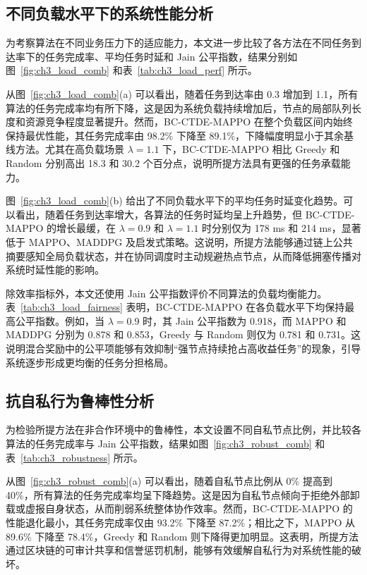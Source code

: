 \subsection{不同负载水平下的系统性能分析}
为考察算法在不同业务压力下的适应能力，本文进一步比较了各方法在不同任务到达率下的任务完成率、平均任务时延和 Jain 公平指数，结果分别如图~\ref{fig:ch3_load_comb} 和表~\ref{tab:ch3_load_perf} 所示。

从图~\ref{fig:ch3_load_comb}(a) 可以看出，随着任务到达率由 0.3 增加到 1.1，所有算法的任务完成率均有所下降，这是因为系统负载持续增加后，节点的局部队列长度和资源竞争程度显著提升。然而，BC-CTDE-MAPPO 在整个负载区间内始终保持最优性能，其任务完成率由 98.2\% 下降至 89.1\%，下降幅度明显小于其余基线方法。尤其在高负载场景 $\lambda=1.1$ 下，BC-CTDE-MAPPO 相比 Greedy 和 Random 分别高出 18.3 和 30.2 个百分点，说明所提方法具有更强的任务承载能力。

图~\ref{fig:ch3_load_comb}(b) 给出了不同负载水平下的平均任务时延变化趋势。可以看出，随着任务到达率增大，各算法的任务时延均呈上升趋势，但 BC-CTDE-MAPPO 的增长最缓，在 $\lambda=0.9$ 和 $\lambda=1.1$ 时分别仅为 178 ms 和 214 ms，显著低于 MAPPO、MADDPG 及启发式策略。这说明，所提方法能够通过链上公共摘要感知全局负载状态，并在协同调度时主动规避热点节点，从而降低拥塞传播对系统时延性能的影响。

除效率指标外，本文还使用 Jain 公平指数评价不同算法的负载均衡能力。表~\ref{tab:ch3_load_fairness} 表明，BC-CTDE-MAPPO 在各负载水平下均保持最高公平指数。例如，当 $\lambda=0.9$ 时，其 Jain 公平指数为 0.918，而 MAPPO 和 MADDPG 分别为 0.878 和 0.853，Greedy 与 Random 则仅为 0.781 和 0.731。这说明混合奖励中的公平项能够有效抑制“强节点持续抢占高收益任务”的现象，引导系统逐步形成更均衡的任务分担格局。

\subsection{抗自私行为鲁棒性分析}
为检验所提方法在非合作环境中的鲁棒性，本文设置不同自私节点比例，并比较各算法的任务完成率与 Jain 公平指数，结果如图~\ref{fig:ch3_robust_comb} 和表~\ref{tab:ch3_robustness} 所示。

从图~\ref{fig:ch3_robust_comb}(a) 可以看出，随着自私节点比例从 0\% 提高到 40\%，所有算法的任务完成率均呈下降趋势。这是因为自私节点倾向于拒绝外部卸载或虚报自身状态，从而削弱系统整体协作效率。然而，BC-CTDE-MAPPO 的性能退化最小，其任务完成率仅由 93.2\% 下降至 87.2\%；相比之下，MAPPO 从 89.6\% 下降至 78.4\%，Greedy 和 Random 则下降得更加明显。这表明，所提方法通过区块链的可审计共享和信誉惩罚机制，能够有效缓解自私行为对系统性能的破坏。

